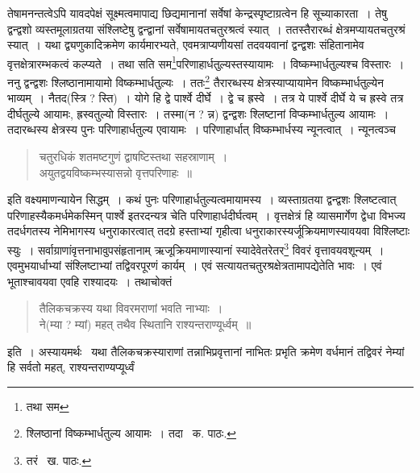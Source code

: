 \documentclass[11pt, openany]{book}
\begin{document}
\noindent तेषामनन्तत्वेऽपि यावदपेक्षं सूक्ष्मत्वमापाद्य छिद्यमानानां सर्वेषां केन्द्रस्पृष्टाग्रत्वेन हि सूच्याकारता~। तेषु द्वन्द्वशो व्यस्तमूलाग्रतया संश्लिष्टेषु द्वन्द्वानां सर्वेषामायतचतुरश्रत्वं स्यात्~। ततस्तैरारब्धं क्षेत्रमप्यायतचतुरश्रं स्यात्~। यथा द्व्यणुकादिक्रमेण कार्यमारभ्यते, एवमत्राप्यणीयसां तदवयवानां द्वन्द्वशः संहितानामेव वृत्तक्षेत्रारम्भकत्वं कल्प्यते~। तथा सति सम\renewcommand{\thefootnote}{१}\footnote{तथा सम}परिणाहार्धतुल्यस्तस्यायामः~। विष्कम्भार्धतुल्यश्च विस्तारः~। ननु द्वन्द्वशः श्लिष्ठानामायामो विष्कम्भार्धतुल्यः~। ततः\renewcommand{\thefootnote}{२}\footnote{श्लिष्ठानां विष्कम्भार्धतुल्य आयामः~। तदा \textendash\ क. पाठः.} तैरारब्धस्य क्षेत्रस्याप्यायामेन विष्कम्भार्धतुल्येन भाव्यम्~। नैतद(स्त्रि ? स्ति)~। योगे हि द्वे पार्श्वे दीर्घे~। द्वे च ह्रस्वे~। तत्र ये पार्श्वे दीर्घे ये च ह्रस्वे तत्र दीर्घतुल्ये आयामः, ह्रस्वतुल्यो विस्तारः~। तस्मा(न ? न्न) द्वन्द्वशः श्लिष्टानां विप्कम्भार्धतुल्य आयामः~। तदारब्धस्य क्षेत्रस्य पुनः परिणाहार्धतुल्य एवायामः~। परिणाहार्धात् विष्कम्भार्धस्य न्यूनत्वात्~। न्यूनत्वञ्च\textendash 

\begin{quote}
{\qt चतुरधिकं शतमष्टगुणं द्वाषष्टिस्तथा सहस्राणाम्~।\\
 अयुतद्वयविष्कम्भस्यासन्नो वृत्तपरिणाहः~॥}
\end{quote}

\noindent इति वक्ष्यमाणन्यायेन सिद्धम्~। कथं पुनः परिणाहार्धतुल्यत्वमायामस्य~। व्यस्ताग्रतया द्वन्द्वशः श्लिष्टत्वात् परिणाहस्यैकमर्धमेकस्मिन् पार्श्वे इतरदन्यत्र चेति परिणाहार्धदीर्घत्वम्~। वृत्तक्षेत्रं हि व्यासमार्गेण द्वेधा विभज्य तदर्धगतस्य नेमिभागस्य धनुराकारत्वात् तदग्रे हस्ताभ्यां गृहीत्वा धनुराकारस्यर्जूक्रियमाणस्यावयवा विश्लिष्टाः स्युः~। सर्वाग्राणांवृत्तनाभावुपसंहृतानाम् ऋजूक्रियमाणास्यानां स्यादेवेतरेतर\renewcommand{\thefootnote}{३}\footnote{तरं \textendash\ ख. पाठः.} विवरं वृत्तावयवशून्यम्~। एवमुभयार्धाभ्यां संश्लिष्टाभ्यां तद्विवरपूरणं कार्यम्~। एवं सत्यायतचतुरश्रक्षेत्रतामापद्येतेति भावः~। एवं भूताश्चावयवा एवहि राश्यादयः~। तथाचोक्तं\textendash 

\begin{quote}
{\qt तैलिकचक्रस्य यथा विवरमराणां भवति नाभ्याः~।\\
 ने(म्या ? म्यां) महत् तथैव स्थितानि राश्यन्तराण्यूर्ध्वम्~॥}
\end{quote}
\noindent इति~। अस्यायमर्थः \textendash\ यथा तैलिकचक्रस्याराणां तन्नाभिप्रवृत्तानां नाभितः प्रभृति क्रमेण वर्धमानं तद्विवरं नेम्यां हि सर्वतो महत्, राश्यन्तराण्यप्यूर्ध्वं

\newpage
\end{document}
